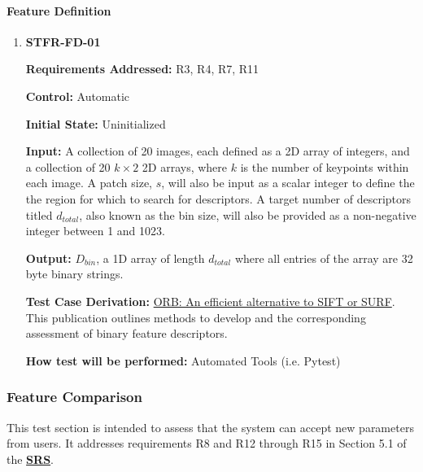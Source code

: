 \documentclass[12pt, titlepage]{article}
\begin{document}
\paragraph{Feature Definition}
\begin{enumerate}
\item \hypertarget{STFR-FD-01}{\textbf{STFR-FD-01}\\}
\textbf{Requirements Addressed:} R3, R4, R7, R11

\textbf{Control:} Automatic

\textbf{Initial State:} Uninitialized

\textbf{Input:} A collection of 20 images, each defined as a 2D array of integers, and a collection of 20 
$k\times 2$ 2D arrays, where $k$ is the number of keypoints within each image. A patch size, $s$, 
will also be input as a scalar integer to define the the region for which to search for descriptors. A target 
number of descriptors titled $d_{total}$, also known as the bin size, will also be provided as a non-negative integer 
between 1 and 1023.

\textbf{Output:} $D_{bin}$, a 1D array of length $d_{total}$ where all entries of the array are 32 byte binary strings. 

\textbf{Test Case Derivation:} \href{https://sites.cc.gatech.edu/classes/AY2024/cs4475_summer/images/ORB_an_efficient_alternative_to_SIFT_or_SURF.pdf}
{ORB: An efficient alternative to SIFT or SURF}. This publication outlines methods 
to develop and the corresponding assessment of binary feature descriptors.

\textbf{How test will be performed:} Automated Tools (i.e. Pytest)
\end{enumerate}

\subsubsection{Feature Comparison}

This test section is intended to assess that the system can accept new parameters from users. It addresses 
requirements R8 and R12 through R15 in Section 5.1 of the 
\textbf{\href{https://github.com/KiranSingh15/CAS-741-Image-Correspondences/blob/main/docs/SRS/SRS.pdf}
{SRS}}. 
		
\end{document}
